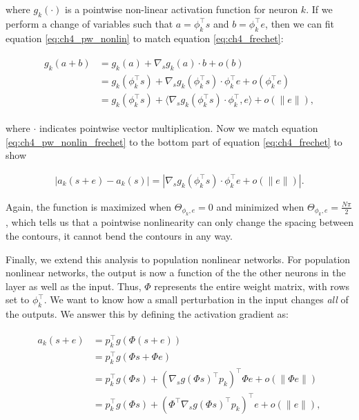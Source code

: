 where $g_{k}(\cdot)$ is a pointwise non-linear activation function for neuron $k$. If we perform a change of variables such that $a = \phi_{k}^\top s$ and $b = \phi_{k}^\top e$, then we can fit equation \eqref{eq:ch4_pw_nonlin} to match equation \eqref{eq:ch4_frechet}:

\begin{align}\label{eq:ch4_pw_nonlin_frechet}
\begin{split}
    g_{k}(a + b) &= g_{k}(a) + \nabla_{s}g_{k}(a) \cdot b + o(b) \\
    &=g_{k}(\phi_{k}^\top s) + \nabla_{s}g_{k}(\phi_{k}^\top s) \cdot \phi_{k}^\top e + o(\phi_{k}^\top e)\\
    &=g_{k}(\phi_{k}^\top s) + \langle\nabla_{s}g_{k}(\phi_{k}^\top s) \cdot \phi_{k}^\top, e\rangle + o(\|e\|),
\end{split}
\end{align}

where $\cdot$ indicates pointwise vector multiplication. Now we match equation \eqref{eq:ch4_pw_nonlin_frechet} to the bottom part of equation \eqref{eq:ch4_frechet} to show 

\begin{equation}
\begin{split}
    |a_{k}(s+e) - a_{k}(s)| = |\nabla_{s}g_{k}(\phi_{k}^\top s) \cdot \phi_{k}^\top e + o(\|e\|)|.
\end{split}
\end{equation}

Again, the function is maximized when $\Theta_{\phi_{k}, e}=0$ and minimized when $\Theta_{\phi_{k}, e}=\tfrac{N\pi}{2}$, which tells us that a pointwise nonlinearity can only change the spacing between the contours, it cannot bend the contours in any way.

Finally, we extend this analysis to population nonlinear networks. For population nonlinear networks, the output is now a function of the the other neurons in the layer as well as the input. Thus, $\Phi$ represents the entire weight matrix, with rows set to $\phi_{k}^\top$. We want to know how a small perturbation in the input changes \emph{all} of the outputs. We answer this by defining the activation gradient as:

\begin{align}\label{eq:pop_nonlinear}
\begin{split}
   a_{k}(s+e) &= p_{k}^\top g(\Phi(s+e)) \\
   &= p_{k}^\top g(\Phi s + \Phi e) \\
   &= p_{k}^\top g(\Phi s) + (\nabla_{s}g(\Phi s)^\top p_{k})^\top \Phi e + o(\|\Phi e\|) \\
   &= p_{k}^\top g(\Phi s) + (\Phi^\top \nabla_{s}g(\Phi s)^\top p_{k})^\top e + o(\|e\|),
\end{split}
\end{align}

